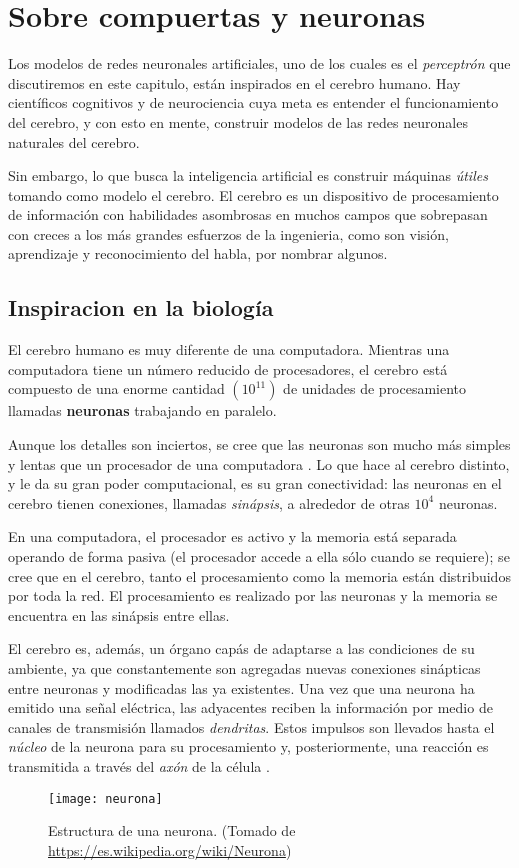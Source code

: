 \section{Sobre compuertas y neuronas}
Los modelos de redes neuronales artificiales, uno de los cuales es el \textit{perceptrón}
que discutiremos en este capitulo, están inspirados en el cerebro humano. Hay científicos
cognitivos y de neurociencia cuya meta es entender el funcionamiento del cerebro, y con
esto en mente, construir modelos de las redes neuronales naturales del cerebro.

Sin embargo, lo que busca la inteligencia artificial es construir máquinas \textit{útiles}
tomando como modelo el cerebro. El cerebro es un dispositivo de procesamiento de información
con habilidades asombrosas en muchos campos que sobrepasan con creces a los más grandes
esfuerzos de la ingenieria, como son visión, aprendizaje y reconocimiento del habla, por
nombrar algunos.

\subsection{Inspiracion en la biología}
El cerebro humano es muy diferente de una computadora. Mientras una computadora tiene
un número reducido de procesadores, el cerebro está compuesto de una enorme cantidad $(10^{11})$
de unidades de procesamiento llamadas \textbf{neuronas} trabajando en paralelo.

Aunque los detalles son inciertos, se cree que las neuronas son mucho más simples y lentas
que un procesador de una computadora \cite{ethem}. Lo que hace al cerebro distinto, y le da
su gran poder computacional, es su gran conectividad: las neuronas en el cerebro tienen
conexiones, llamadas \textit{sinápsis}, a alrededor de otras $10^{4}$ neuronas.

En una computadora, el procesador es activo y la memoria está separada operando de forma pasiva
(el procesador accede a ella sólo cuando se requiere); se cree que en el cerebro, tanto el
procesamiento como la memoria están distribuidos por toda la red. El procesamiento es realizado
por las neuronas y la memoria se encuentra en las sinápsis entre ellas.

El cerebro es, además, un órgano capás de adaptarse a las condiciones de su ambiente, ya que
constantemente son agregadas nuevas conexiones sinápticas entre neuronas y modificadas
las ya existentes. Una vez que una neurona ha emitido una señal eléctrica, las adyacentes
reciben la información por medio de canales de transmisión llamados \textit{dendritas}. Estos
impulsos son llevados hasta el \textit{núcleo} de la neurona para su procesamiento y, posteriormente,
una reacción es transmitida a través del \textit{axón} de la célula \cite{memes}.
\begin{figure}[h]
  \texttt{[image: neurona]}
  \centering
  \caption{Estructura de una neurona. (Tomado de \url{https://es.wikipedia.org/wiki/Neurona})}
\end{figure}

